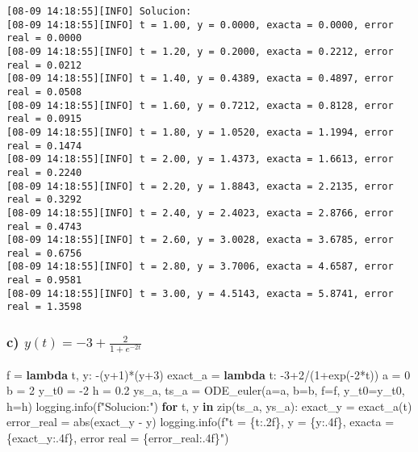 \documentclass[
  letterpaper,
  DIV=11,
  numbers=noendperiod]{scrartcl}
\newenvironment{Shaded}{\begin{snugshade}}{\end{snugshade}}
\newcommand{\BuiltInTok}[1]{\textcolor[rgb]{0.00,0.23,0.31}{#1}}
\newcommand{\ControlFlowTok}[1]{\textcolor[rgb]{0.00,0.23,0.31}{\textbf{#1}}}
\newcommand{\DecValTok}[1]{\textcolor[rgb]{0.68,0.00,0.00}{#1}}
\newcommand{\FloatTok}[1]{\textcolor[rgb]{0.68,0.00,0.00}{#1}}
\newcommand{\KeywordTok}[1]{\textcolor[rgb]{0.00,0.23,0.31}{\textbf{#1}}}
\newcommand{\NormalTok}[1]{\textcolor[rgb]{0.00,0.23,0.31}{#1}}
\newcommand{\OperatorTok}[1]{\textcolor[rgb]{0.37,0.37,0.37}{#1}}
\newcommand{\SpecialCharTok}[1]{\textcolor[rgb]{0.37,0.37,0.37}{#1}}
\newcommand{\SpecialStringTok}[1]{\textcolor[rgb]{0.13,0.47,0.30}{#1}}
\begin{document}
\begin{verbatim}
[08-09 14:18:55][INFO] Solucion:
[08-09 14:18:55][INFO] t = 1.00, y = 0.0000, exacta = 0.0000, error real = 0.0000
[08-09 14:18:55][INFO] t = 1.20, y = 0.2000, exacta = 0.2212, error real = 0.0212
[08-09 14:18:55][INFO] t = 1.40, y = 0.4389, exacta = 0.4897, error real = 0.0508
[08-09 14:18:55][INFO] t = 1.60, y = 0.7212, exacta = 0.8128, error real = 0.0915
[08-09 14:18:55][INFO] t = 1.80, y = 1.0520, exacta = 1.1994, error real = 0.1474
[08-09 14:18:55][INFO] t = 2.00, y = 1.4373, exacta = 1.6613, error real = 0.2240
[08-09 14:18:55][INFO] t = 2.20, y = 1.8843, exacta = 2.2135, error real = 0.3292
[08-09 14:18:55][INFO] t = 2.40, y = 2.4023, exacta = 2.8766, error real = 0.4743
[08-09 14:18:55][INFO] t = 2.60, y = 3.0028, exacta = 3.6785, error real = 0.6756
[08-09 14:18:55][INFO] t = 2.80, y = 3.7006, exacta = 4.6587, error real = 0.9581
[08-09 14:18:55][INFO] t = 3.00, y = 4.5143, exacta = 5.8741, error real = 1.3598
\end{verbatim}

\subsubsection{\texorpdfstring{c)
\(y(t)=-3+\frac{2}{1+e^{-2t}}\)}{c) y(t)=-3+\textbackslash frac\{2\}\{1+e\^{}\{-2t\}\}}}\label{c-yt-3frac21e-2t}

\begin{Shaded}
\begin{Highlighting}[]
\NormalTok{f }\OperatorTok{=} \KeywordTok{lambda}\NormalTok{ t, y: }\OperatorTok{{-}}\NormalTok{(y}\OperatorTok{+}\DecValTok{1}\NormalTok{)}\OperatorTok{*}\NormalTok{(y}\OperatorTok{+}\DecValTok{3}\NormalTok{)}
\NormalTok{exact\_a }\OperatorTok{=} \KeywordTok{lambda}\NormalTok{ t: }\OperatorTok{{-}}\DecValTok{3}\OperatorTok{+}\DecValTok{2}\OperatorTok{/}\NormalTok{(}\DecValTok{1}\OperatorTok{+}\NormalTok{exp(}\OperatorTok{{-}}\DecValTok{2}\OperatorTok{*}\NormalTok{t))}
\NormalTok{a }\OperatorTok{=} \DecValTok{0}
\NormalTok{b }\OperatorTok{=} \DecValTok{2}
\NormalTok{y\_t0 }\OperatorTok{=} \OperatorTok{{-}}\DecValTok{2}
\NormalTok{h }\OperatorTok{=} \FloatTok{0.2}
\NormalTok{ys\_a, ts\_a }\OperatorTok{=}\NormalTok{ ODE\_euler(a}\OperatorTok{=}\NormalTok{a, b}\OperatorTok{=}\NormalTok{b, f}\OperatorTok{=}\NormalTok{f, y\_t0}\OperatorTok{=}\NormalTok{y\_t0, h}\OperatorTok{=}\NormalTok{h)}
\NormalTok{logging.info(}\SpecialStringTok{f"Solucion:"}\NormalTok{)}
\ControlFlowTok{for}\NormalTok{ t, y }\KeywordTok{in} \BuiltInTok{zip}\NormalTok{(ts\_a, ys\_a):}
\NormalTok{    exact\_y }\OperatorTok{=}\NormalTok{ exact\_a(t)}
\NormalTok{    error\_real }\OperatorTok{=} \BuiltInTok{abs}\NormalTok{(exact\_y }\OperatorTok{{-}}\NormalTok{ y)}
\NormalTok{    logging.info(}\SpecialStringTok{f"t = }\SpecialCharTok{\{}\NormalTok{t}\SpecialCharTok{:.2f\}}\SpecialStringTok{, y = }\SpecialCharTok{\{}\NormalTok{y}\SpecialCharTok{:.4f\}}\SpecialStringTok{, exacta = }\SpecialCharTok{\{}\NormalTok{exact\_y}\SpecialCharTok{:.4f\}}\SpecialStringTok{, error real = }\SpecialCharTok{\{}\NormalTok{error\_real}\SpecialCharTok{:.4f\}}\SpecialStringTok{"}\NormalTok{)}
\end{Highlighting}
\end{Shaded}
\end{document}

